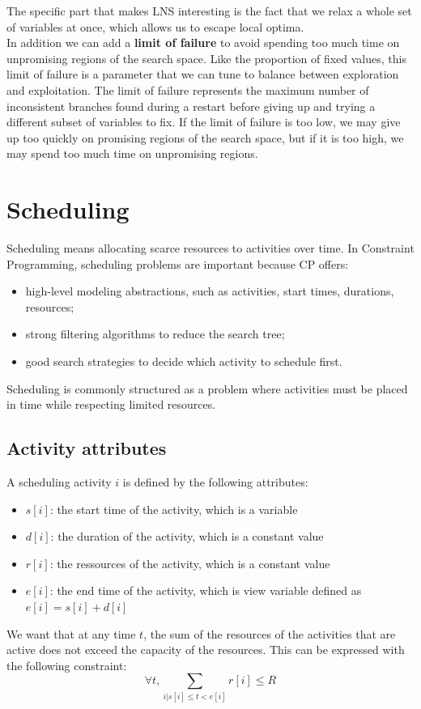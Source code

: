 \documentclass[12pt, openany]{report}
\theoremstyle{definition}
\begin{document}
The specific part that makes LNS interesting is the fact that we relax a whole set of variables at once, which allows us to escape local optima.\\
In addition we can add a \textbf{limit of failure} to avoid spending too much time on unpromising regions of the search space. Like the proportion of fixed values, this limit of failure is a parameter that we can tune to balance between exploration and exploitation. The limit of failure represents the maximum number of inconsistent branches found during a restart before giving up and trying a different subset of variables to fix. If the limit of failure is too low, we may give up too quickly on promising regions of the search space, but if it is too high, we may spend too much time on unpromising regions.
\chapter{Scheduling}
Scheduling means allocating scarce resources to activities over time. In Constraint Programming, scheduling problems are important because CP offers:
\begin{itemize}
    \item high-level modeling abstractions, such as activities, start times, durations, resources;
    \item strong filtering algorithms to reduce the search tree;
    \item good search strategies to decide which activity to schedule first.
\end{itemize}
Scheduling is commonly structured as a problem where activities must be placed in time while respecting limited resources.
\section{Activity attributes}
A scheduling activity $i$ is defined by the following attributes:
\begin{itemize}
    \item $s[i]$: the start time of the activity, which is a variable
    \item $d[i]$: the duration of the activity, which is a constant value
    \item $r[i]$: the ressources of the activity, which is a constant value
    \item $e[i]$: the end time of the activity, which is view variable defined as $e[i] = s[i] + d[i]$
\end{itemize}
We want that at any time $t$, the sum of the resources of the activities that are active does not exceed the capacity of the resources. This can be expressed with the following constraint:
\begin{equation}
    \forall t, \sum_{i | s[i] \leq t < e[i]} r[i] \leq R
\end{equation}
\end{document}
